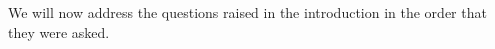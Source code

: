 \documentclass{article}
\begin{document}
  
  We will now address the questions raised in the introduction in the order
  that they were asked.  %


\end{document}
